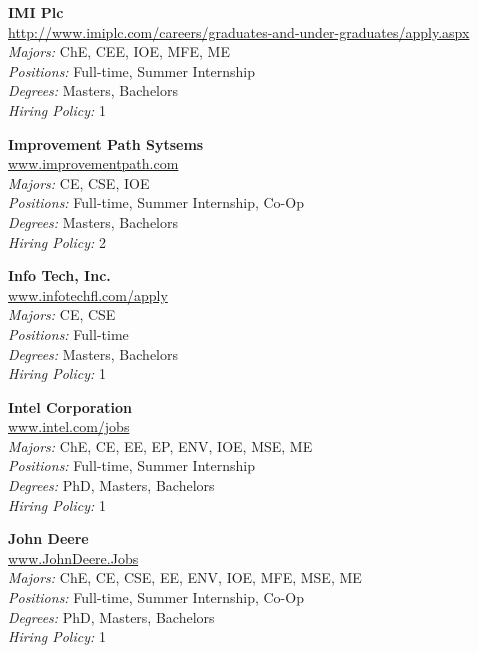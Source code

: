 \documentclass{article}
\begin{document}
\begin{center}
\begin{multicols}{3}
\begin{minipage}{.9\columnwidth}{\Large\bf IMI Plc }\\
	\url{http://www.imiplc.com/careers/graduates-and-under-graduates/apply.aspx}\\
	\emph{Majors:} ChE, CEE, IOE, MFE, ME\\
	\emph{Positions:} Full-time, Summer Internship\\
	\emph{Degrees:} Masters, Bachelors\\
	\emph{Hiring Policy:} 1\\
\end{minipage}
 
\begin{minipage}{.9\columnwidth}{\Large\bf Improvement Path Sytsems }\\
	\url{www.improvementpath.com}\\
	\emph{Majors:} CE, CSE, IOE\\
	\emph{Positions:} Full-time, Summer Internship, Co-Op\\
	\emph{Degrees:} Masters, Bachelors\\
	\emph{Hiring Policy:} 2\\
\end{minipage}
 
\begin{minipage}{.9\columnwidth}{\Large\bf Info Tech, Inc. }\\
	\url{www.infotechfl.com/apply}\\
	\emph{Majors:} CE, CSE\\
	\emph{Positions:} Full-time\\
	\emph{Degrees:} Masters, Bachelors\\
	\emph{Hiring Policy:} 1\\
\end{minipage}
 
\begin{minipage}{.9\columnwidth}{\Large\bf Intel Corporation }\\
	\url{www.intel.com/jobs}\\
	\emph{Majors:} ChE, CE, EE, EP, ENV, IOE, MSE, ME\\
	\emph{Positions:} Full-time, Summer Internship\\
	\emph{Degrees:} PhD, Masters, Bachelors\\
	\emph{Hiring Policy:} 1\\
\end{minipage}
 
\begin{minipage}{.9\columnwidth}{\Large\bf John Deere }\\
	\url{www.JohnDeere.Jobs}\\
	\emph{Majors:} ChE, CE, CSE, EE, ENV, IOE, MFE, MSE, ME\\
	\emph{Positions:} Full-time, Summer Internship, Co-Op\\
	\emph{Degrees:} PhD, Masters, Bachelors\\
	\emph{Hiring Policy:} 1\\
\end{minipage}
 

\end{multicols}
\end{center}
\end{document}

